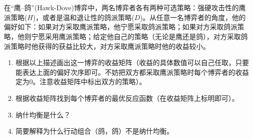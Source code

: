 \documentclass[12pt,a4paper]{article}
\begin{document}
\maketitle

\section{}
在``鹰--鸽''(Hawk-Dove)博弈中，两名博弈者各有两种可选策略：强硬攻击性的鹰派策略($H$)，或者是温和退让性的鸽派策略($D$)。从任意一名博弈者的角度，他的偏好如下：如果对方采取鹰派策略，他宁愿采取鸽派策略；如果对方采取鸽派策略，他则宁愿采用鹰派策略；给定他自己的策略（无论是鹰还是鸽），对方采取鸽派策略时他获得的获益比较大，对方采取鹰派策略时他的收益较小。

\begin{enumerate}[label=\alph*.]
  \item 根据以上描述画出这一博弈的收益矩阵（收益的具体数值可以自己任取，只要能表达上面的偏好次序即可。不妨把双方都采取鹰派策略时每个博弈者的收益定为0。注意收益矩阵中标出双方的策略）。
  \item 根据收益矩阵找到每个博弈者的最优反应函数（在收益矩阵上标明即可）。
  \item 纳什均衡是什么？
  \item 简要解释为什么行动组合（鸽，鸽）不是纳什均衡。
\end{enumerate}

\vspace{0.5cm}
\end{document}
